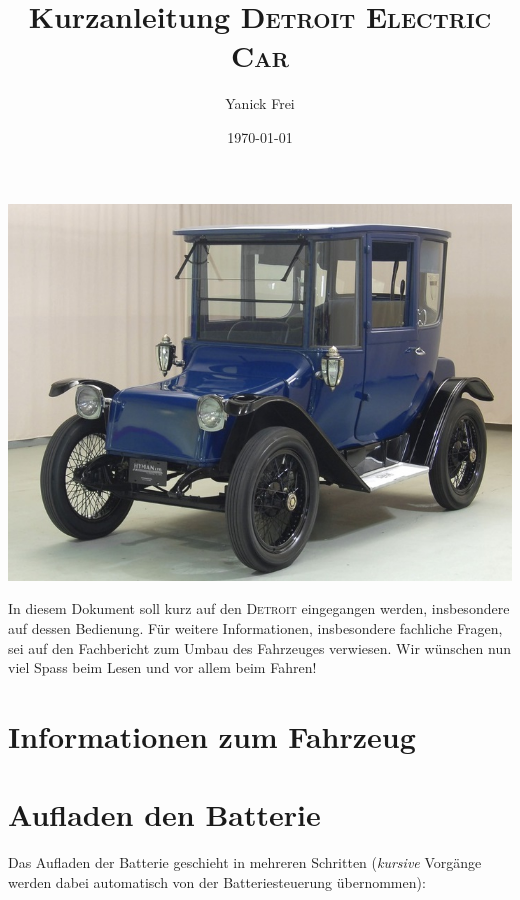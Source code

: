 \documentclass[a4paper]{fhnwreport}
\title{Kurzanleitung \textsc{Detroit Electric Car}}
\author{Yanick Frei}
\date{\today}
\begin{document}
\begin{Large}
\setlength{\itemsep}{20pt}

\maketitle
\includegraphics[width=1.00\textwidth]{Titelbild.jpg}

\newpage

In diesem Dokument soll kurz auf den \textsc{Detroit} eingegangen werden, insbesondere auf dessen Bedienung. Für weitere Informationen, insbesondere fachliche Fragen, sei auf den Fachbericht zum Umbau des Fahrzeuges verwiesen. Wir wünschen nun viel Spass beim Lesen und vor allem beim Fahren!

\tableofcontents \newpage

\section{Informationen zum Fahrzeug}

\section{Aufladen den Batterie}
Das Aufladen der Batterie geschieht in mehreren Schritten (\textit{kursive} Vorgänge werden dabei automatisch von der Batteriesteuerung übernommen):


\end{Large}
\end{document}
